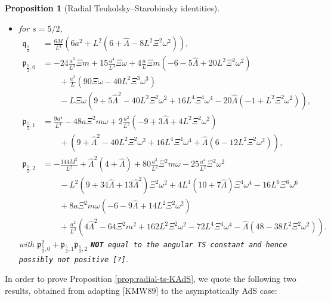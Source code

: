 \documentclass[11pt]{article}
\newtheorem{proposition}{Proposition}[section]
\numberwithin{equation}{section}
\begin{document}
\begin{proposition}[Radial Teukolsky--Starobinsky identities]
\begin{itemize}
\begin{align*}
&\qquad
+48\hat\Lambda\left(
\left(1+\frac{a^2}{L^2}\right)a^2\Xi^2\omega^2
+a\Xi^2m\omega\left(1-3\frac{a^2}{L^2}\right)
+2\frac{a^2}{L^2}\Xi^2 m^2
\right)\\
&\qquad
-48\frac{a^2}{L^2}\hat\Lambda \left(1+\frac{a^2}{L^2}\right)
+144\left(a\Xi^2m\omega-a^2\Xi^2\omega^2+\frac{a^2}{L^2}\right)^2;
\end{align*}
\item for $s=5/2$,
\begin{align*}
\mathfrak q_{\frac52}
&= \frac{6M}{L^3}\left(6a^2 + L^2(6+\hat\Lambda - 8L^2\Xi^2\omega^2)\right),\\
\mathfrak p_{\frac52,0}
&= -24\frac{a^3}{L^3}\Xi m + 15\frac{a^4}{L^3}\Xi\omega
+ 4\frac{a}{L}\Xi m(-6 - 5\hat\Lambda + 20L^2\Xi^2\omega^2)\\
&\qquad
+ \frac{a^2}{L}(90\Xi\omega - 40L^2\Xi^3\omega^3)\\
&\qquad
- L\Xi\omega\left(
9 + 5\hat\Lambda^2 - 40L^2\Xi^2\omega^2
+ 16L^4\Xi^4\omega^4
- 20\hat\Lambda(-1 + L^2\Xi^2\omega^2)
\right),\\
\mathfrak p_{\frac52,1}
&= \frac{9a^4}{L^4} - 48a\Xi^2m\omega
+ 2\frac{a^2}{L^2}(-9 + 3\hat\Lambda + 4L^2\Xi^2\omega^2)\\
&\qquad
+\left(
9 + \hat\Lambda^2 - 40L^2\Xi^2\omega^2
+ 16L^4\Xi^4\omega^4
+ \hat\Lambda(6 - 12L^2\Xi^2\omega^2)
\right),\\
\mathfrak p_{\frac52,2}
&= - \frac{144M^2}{L^2} + \hat\Lambda^2(4+\hat\Lambda) 
+ 80\frac{a^3}{L^2}\Xi^2m\omega - 25\frac{a^4}{L^2}\Xi^2\omega^2\\
&\qquad
- L^2(9 + 34\hat\Lambda + 13\hat\Lambda^2)\Xi^2\omega^2
+ 4L^4(10 + 7\hat\Lambda)\Xi^4\omega^4
- 16L^6\Xi^6\omega^6\\
&\qquad
+ 8a\Xi^2m\omega(-6 - 9\hat\Lambda + 14L^2\Xi^2\omega^2)\\
&\qquad
+ \frac{a^2}{L^2}\left(
4\hat\Lambda^2 - 64\Xi^2m^2
+ 162L^2\Xi^2\omega^2 - 72L^4\Xi^4\omega^4
- \hat\Lambda(48 - 38L^2\Xi^2\omega^2)
\right).
\end{align*}
with $\mathfrak p_{\frac52,0}^2+\mathfrak p_{\frac52,1}\mathfrak p_{\frac52,2}$ \texttt{\textbf{NOT} equal to the angular TS constant and hence possibly not positive [?]}.
\end{itemize}



\end{proposition}

In order to prove Proposition \ref{prop:radial-ts-KAdS}, we quote the following two results, obtained from adapting [KMW89] to the asymptotically AdS case:
\end{document}
